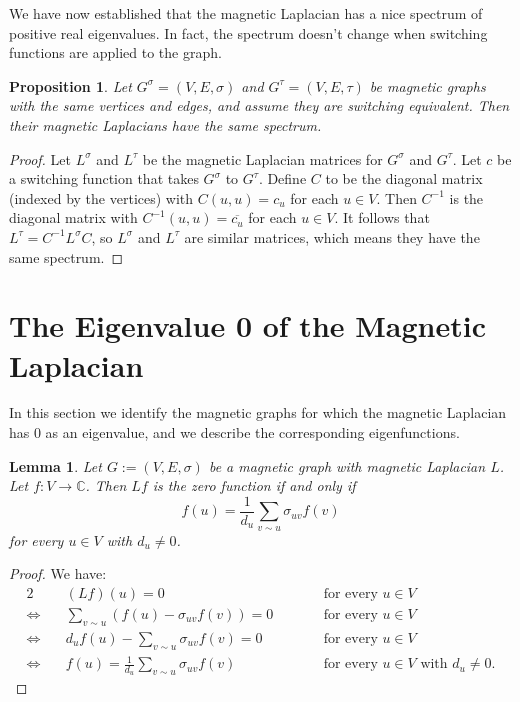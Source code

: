 \documentclass{article}
\newtheorem{prop}[thm]{Proposition}
\newtheorem{lem}[thm]{Lemma}
\theoremstyle{definition}
\newcommand{\C}{\mathbb C}
\begin{document}
We have now established that the magnetic Laplacian has a nice spectrum of positive real eigenvalues. In fact, the spectrum doesn't change when switching functions are applied to the graph.

\begin{prop}\label{switching preserves spectrum}
    Let $G^\sigma = (V, E, \sigma)$ and $G^\tau = (V, E, \tau)$ be magnetic graphs with the same vertices and edges, and assume they are switching equivalent. Then their magnetic Laplacians have the same spectrum.
\end{prop}
\begin{proof}
    Let $L^\sigma$ and $L^\tau$ be the magnetic Laplacian matrices for $G^\sigma$ and $G^\tau$. Let $c$ be a switching function that takes $G^\sigma$ to $G^\tau$. Define $C$ to be the diagonal matrix (indexed by the vertices) with $C(u, u) = c_u$ for each $u \in V$. Then $C^{-1}$ is the diagonal matrix with $C^{-1}(u, u) = \overline{c_u}$ for each $u \in V$. It follows that $L^\tau = C^{-1} L^{\sigma} C$, so $L^\sigma$ and $L^\tau$ are similar matrices, which means they have the same spectrum.
\end{proof}

\section{The Eigenvalue 0 of the Magnetic Laplacian}

In this section we identify the magnetic graphs for which the magnetic Laplacian has 0 as an eigenvalue, and we describe the corresponding eigenfunctions.

\begin{lem}\label{average characterization of null space of Laplacian}
    Let $G := (V, E, \sigma)$ be a magnetic graph with magnetic Laplacian $L$. Let $f:V \rightarrow \C$. Then $L f$ is the zero function if and only if 
    $$
    f(u) = \frac{1}{d_u} \sum_{v \sim u} \sigma_{uv} f(v)
    $$
    for every $u \in V$ with $d_u \neq 0$.
\end{lem}
\begin{proof}
    We have:
    \begin{alignat*}{2}
        &(L f)(u) = 0 & \quad\quad &\text{for every $u \in V$} \\
        \iff\quad &\sum_{v \sim u}(f(u) - \sigma_{uv}f(v)) = 0 & &\text{for every $u \in V$} \\
        \iff\quad &d_u f(u) - \sum_{v \sim u} \sigma_{uv}f(v) = 0 & &\text{for every $u \in V$} \\
        \iff\quad &f(u) = \frac{1}{d_u} \sum_{v \sim u} \sigma_{uv}f(v) & &\text{for every $u \in V$ with $d_u \neq 0$}.
    \end{alignat*}
\end{proof}
\end{document}
